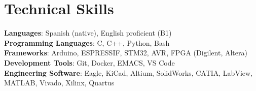 \documentclass[letterpaper,11pt]{article}
\begin{document}
\section{Technical Skills}
 \begin{itemize}[leftmargin=0.15in, label={}]
    \small{\item{
     \textbf{Languages}{: Spanish (native), English proficient (B1)} \\
     \textbf{Programming Languages}{: C, C++, Python, Bash} \\
     \textbf{Frameworks}{: Arduino, ESPRESSIF, STM32, AVR, FPGA (Digilent, Altera)} \\
     \textbf{Development Tools}{: Git, Docker, EMACS, VS Code} \\
     \textbf{Engineering Software}{: Eagle, KiCad, Altium, SolidWorks, CATIA, LabView, MATLAB, Vivado, Xilinx, Quartus}
    }}
 \end{itemize}
\end{document}
